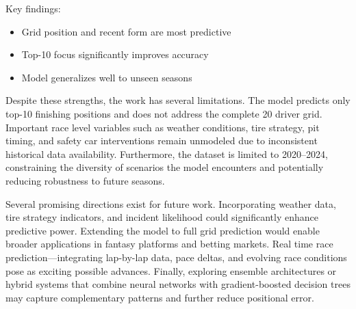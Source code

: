 \documentclass{article}
\begin{document}
Key findings:
\begin{itemize}
    \item Grid position and recent form are most predictive
    \item Top-10 focus significantly improves accuracy
    \item Model generalizes well to unseen seasons
\end{itemize}


Despite these strengths, the work has several limitations. The model predicts only top-10 finishing positions and does not address the complete 20 driver grid. Important race level variables such as weather conditions, tire strategy, pit timing, and safety car interventions remain unmodeled due to inconsistent historical data availability. Furthermore, the dataset is limited to 2020–2024, constraining the diversity of scenarios the model encounters and potentially reducing robustness to future seasons.

Several promising directions exist for future work. Incorporating weather data, tire strategy indicators, and incident likelihood could significantly enhance predictive power. Extending the model to full grid prediction would enable broader applications in fantasy platforms and betting markets. Real time race prediction—integrating lap-by-lap data, pace deltas, and evolving race conditions pose as exciting possible advances. Finally, exploring ensemble architectures or hybrid systems that combine neural networks with gradient-boosted decision trees may capture complementary patterns and further reduce positional error.




\end{document}

